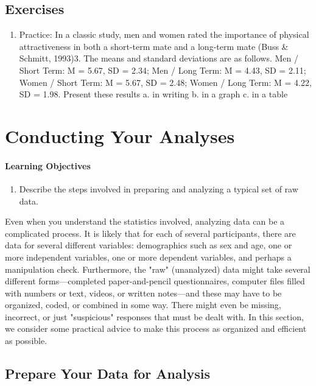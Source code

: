 \subsection{Exercises}
\begin{fullwidth}
\begin{enumerate}
\item Practice: In a classic study, men and women rated the importance of physical attractiveness in both a short-term mate and a long-term mate (Buss \& Schmitt, 1993)3. The means and standard deviations are as follows. Men / Short Term: M = 5.67, SD = 2.34; Men / Long Term: M =
4.43, SD = 2.11; Women / Short Term: M = 5.67, SD = 2.48; Women / Long Term: M = 4.22, SD = 1.98. Present these results
a. in writing b. in a graph c. in a table

\end{enumerate}
\end{fullwidth}


\section{Conducting Your Analyses}

\paragraph{Learning Objectives}
    \begin{enumerate}
    \item   Describe the steps involved in preparing and analyzing a typical set of raw data.
      \end{enumerate}


Even when you understand the statistics involved, analyzing data can be a complicated process. It is likely that for each of several participants, there are data for several different variables: demographics such as sex and age, one or more independent variables, one or more dependent variables, and perhaps a manipulation check. Furthermore, the "raw" (unanalyzed) data might take several different forms---completed paper-and-pencil questionnaires, computer files filled with numbers or text, videos, or written notes---and these may have to be organized, coded, or combined in some way. There might even be missing, incorrect, or just "suspicious" responses that must be dealt with. In this section, we consider some practical advice to make this process as organized and efficient as possible.


\subsection{Prepare Your Data for Analysis}

